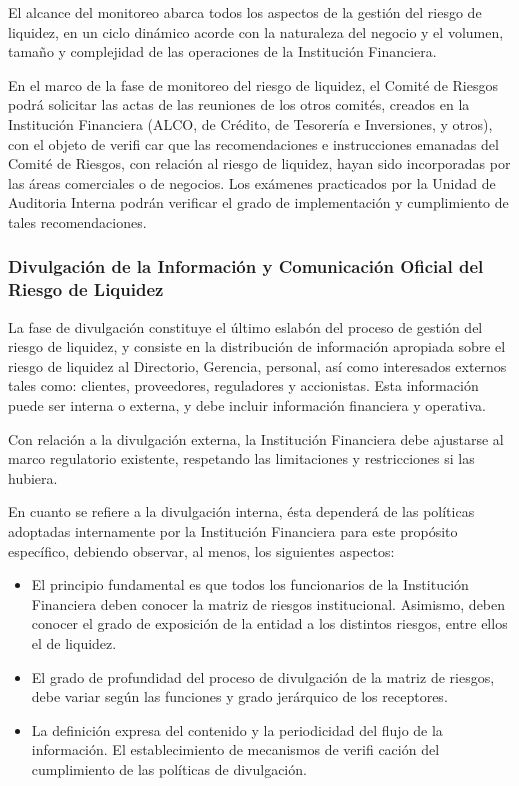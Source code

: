 \documentclass[]{article}
\begin{document}
El alcance del monitoreo abarca todos los aspectos de la gestión del
riesgo de liquidez, en un ciclo dinámico acorde con la naturaleza del
negocio y el volumen, tamaño y complejidad de las operaciones de la
Institución Financiera.

En el marco de la fase de monitoreo del riesgo de liquidez, el Comité de
Riesgos podrá solicitar las actas de las reuniones de los otros comités,
creados en la Institución Financiera (ALCO, de Crédito, de Tesorería e
Inversiones, y otros), con el objeto de verifi car que las
recomendaciones e instrucciones emanadas del Comité de Riesgos, con
relación al riesgo de liquidez, hayan sido incorporadas por las áreas
comerciales o de negocios. Los exámenes practicados por la Unidad de
Auditoria Interna podrán verificar el grado de implementación y
cumplimiento de tales recomendaciones.

\hypertarget{divulgacion-de-la-informacion-y-comunicacion-oficial-del-riesgo-de-liquidez}{%
\subsubsection{Divulgación de la Información y Comunicación Oficial del
Riesgo de
Liquidez}\label{divulgacion-de-la-informacion-y-comunicacion-oficial-del-riesgo-de-liquidez}}

La fase de divulgación constituye el último eslabón del proceso de
gestión del riesgo de liquidez, y consiste en la distribución de
información apropiada sobre el riesgo de liquidez al Directorio,
Gerencia, personal, así como interesados externos tales como: clientes,
proveedores, reguladores y accionistas. Esta información puede ser
interna o externa, y debe incluir información financiera y operativa.

Con relación a la divulgación externa, la Institución Financiera debe
ajustarse al marco regulatorio existente, respetando las limitaciones y
restricciones si las hubiera.

En cuanto se refiere a la divulgación interna, ésta dependerá de las
políticas adoptadas internamente por la Institución Financiera para este
propósito específico, debiendo observar, al menos, los siguientes
aspectos:

\begin{itemize}
\item
  El principio fundamental es que todos los funcionarios de la
  Institución Financiera deben conocer la matriz de riesgos
  institucional. Asimismo, deben conocer el grado de exposición de la
  entidad a los distintos riesgos, entre ellos el de liquidez.
\item
  El grado de profundidad del proceso de divulgación de la matriz de
  riesgos, debe variar según las funciones y grado jerárquico de los
  receptores.
\item
  La definición expresa del contenido y la periodicidad del flujo de la
  información. El establecimiento de mecanismos de verifi cación del
  cumplimiento de las políticas de divulgación.
\end{itemize}
\end{document}
